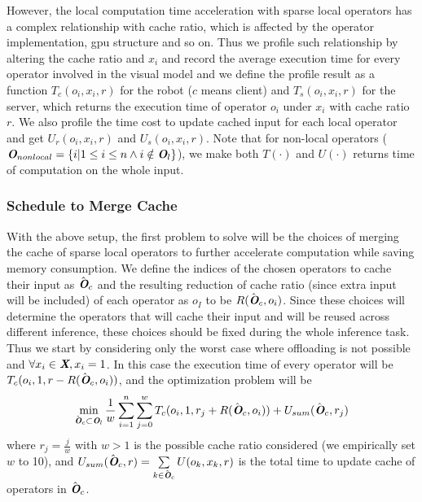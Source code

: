 However, the local computation time acceleration with sparse local operators has a complex relationship with cache ratio, which is affected by the operator implementation, gpu structure and so on.
Thus we profile such relationship by altering the cache ratio and $x_i$ and record the average execution time for every operator involved in the visual model and we define the profile result as a function $T_c(o_i, x_i, r)$ for the robot ($c$ means client) and $T_s(o_i, x_i, r)$ for the server, which returns the execution time of operator $o_i$ under $x_i$ with cache ratio $r$.
We also profile the time cost to update cached input for each local operator and get $U_r(o_i, x_i, r)$ and $U_s(o_i, x_i, r)$.
Note that for non-local operators ($\textit{\textbf{O}}_{nonlocal}=\{i|1\le i\le n \land i \notin \textit{\textbf{O}}_l\}$), we make both $T(\cdot)$ and $U(\cdot)$ returns time of computation on the whole input.

\subsubsection{Schedule to Merge Cache}
With the above setup, the first problem to solve will be the choices of merging the cache of sparse local operators to further accelerate computation while saving memory consumption.
We define the indices of the chosen operators to cache their input as $\hat{\textit{\textbf{O}}}_c$ and the resulting reduction of cache ratio (since extra input will be included) of each operator as $o_I$ to be $R(\hat{\textit{\textbf{O}}}_c, o_i)$.
Since these choices will determine the operators that will cache their input and will be reused across different inference, these choices should be fixed during the whole inference task.
Thus we start by considering only the worst case where offloading is not possible and $\forall x_i\in \textit{\textbf{X}}, x_i=1$.
In this case the execution time of every operator will be $T_c(o_i, 1, r-R(\hat{\textit{\textbf{O}}}_c, o_i))$, and the optimization problem will be 
\begin{equation}
    \min\limits_{\hat{\textit{\textbf{O}}}_c \subset \textit{\textbf{O}}_l} \frac{1}{w} \sum_{i=1}^n \sum_{j=0}^w T_c(o_i, 1, r_j+R(\hat{\textit{\textbf{O}}}_c, o_i)) + U_{sum}(\hat{\textit{\textbf{O}}}_c, r_j)
    \label{eq:cached op}
\end{equation}
where $r_j = \frac{j}{w}$ with $w>1$ is the possible cache ratio considered (we empirically set $w$ to 10), and $U_{sum}(\hat{\textit{\textbf{O}}}_c, r) = \sum\limits_{k \in \hat{\textit{\textbf{O}}}_c} U(o_k, x_k, r)$ is the total time to update cache of operators in $\hat{\textit{\textbf{O}}}_c$.

